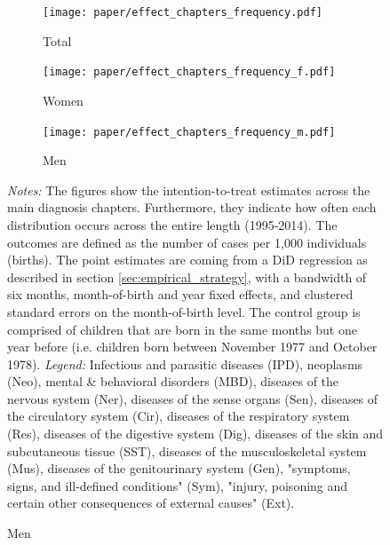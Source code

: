 \documentclass[11pt, a4paper,draft]{article} %
\begin{document}
\vspace*{\fill}
\begin{figure}[H]\centering
	\caption{Intention-to-treat effects across main chapters}\label{fig: lc_hospital2_gdr_DD}
	\begin{subfigure}[h]{0.48\linewidth}\centering\caption{Total}
		\texttt{[image: paper/effect\_chapters\_frequency.pdf]}
	\end{subfigure}
	
	
	\begin{subfigure}[h]{0.48\linewidth}\centering\caption{Women}
		\texttt{[image: paper/effect\_chapters\_frequency\_f.pdf]}
	\end{subfigure}
	\quad
	\begin{subfigure}[h]{0.48\linewidth}\centering\caption{Men}
		\texttt{[image: paper/effect\_chapters\_frequency\_m.pdf]}
	\end{subfigure}
	\scriptsize
	\begin{minipage}{\linewidth}
		\emph{Notes:} The figures show the intention-to-treat estimates across the main diagnosis chapters. Furthermore, they indicate how often each distribution occurs across the entire length (1995-2014). The outcomes are defined as the number of cases per 1,000 individuals (births). The point estimates are coming from a DiD regression as described in section \ref{sec:empirical_strategy}, with a bandwidth of six months, month-of-birth and year fixed effects, and clustered standard errors on the month-of-birth level. The control group is comprised of children	that are born in the same months but one year before (i.e. children born between November 1977 and October 1978). \newline
		\emph{Legend:} Infectious and parasitic diseases (IPD), neoplasms (Neo), mental \& behavioral disorders (MBD), diseases of the nervous system (Ner), diseases of the sense organs (Sen), diseases of the circulatory system (Cir), diseases of the respiratory system (Res), diseases of the digestive system (Dig), diseases of the skin and subcutaneous tissue (SST), diseases of the musculoskeletal system (Mus), diseases of the genitourinary system (Gen), "symptoms, signs, and ill-defined conditions" (Sym), "injury, poisoning and certain other consequences of external causes" (Ext).

	\end{minipage}
\end{figure}
\vspace*{\fill}\clearpage
\end{document}

